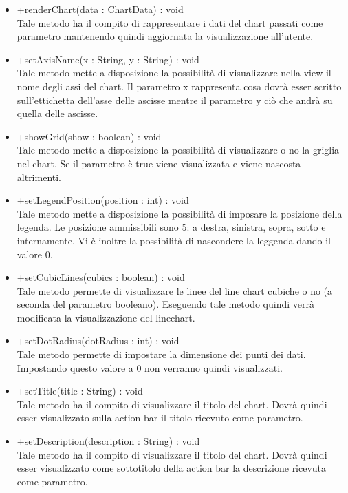 \begin{itemize}
\begin{itemize}
					\item[\ding{111}] {{+renderChart(data : ChartData) : void}} \\ [1mm] Tale metodo ha il compito di rappresentare i dati del chart passati come parametro mantenendo quindi aggiornata la visualizzazione all'utente.
					\item[\ding{111}] {{+setAxisName(x : String, y : String) : void}} \\ [1mm] Tale metodo mette a disposizione la possibilità di visualizzare nella view il nome degli assi del chart. Il parametro x rappresenta cosa dovrà esser scritto sull'ettichetta dell'asse delle ascisse mentre il parametro y ciò che andrà su quella delle ascisse.
					\item[\ding{111}] {{+showGrid(show : boolean) : void}} \\ [1mm] Tale metodo mette a disposizione la possibilità di visualizzare o no la griglia nel chart. Se il parametro è true viene visualizzata e viene nascosta altrimenti.
					\item[\ding{111}] {{+setLegendPosition(position : int) : void}} \\ [1mm] Tale metodo mette a disposizione la possibilità di imposare la posizione della legenda. Le posizione ammissibili sono 5: a destra, sinistra, sopra, sotto e internamente. Vi è inoltre la possibilità di nascondere la leggenda dando il valore 0.
					\item[\ding{111}] {{+setCubicLines(cubics : boolean) : void}} \\ [1mm] Tale metodo permette di visualizzare le linee del line chart cubiche o no (a seconda del parametro booleano). Eseguendo tale metodo quindi verrà modificata la visualizzazione del linechart.
					\item[\ding{111}] {{+setDotRadius(dotRadius : int) : void}} \\ [1mm] Tale metodo permette di impostare la dimensione dei punti dei dati. Impostando questo valore a 0 non verranno quindi visualizzati.
					\item[\ding{111}] {{+setTitle(title : String) : void}} \\ [1mm] Tale metodo ha il compito di visualizzare il titolo del chart. Dovrà quindi esser visualizzato sulla action bar il titolo ricevuto come parametro.
					\item[\ding{111}] {{+setDescription(description : String) : void}} \\ [1mm] Tale metodo ha il compito di visualizzare il titolo del chart. Dovrà quindi esser visualizzato come sottotitolo della action bar la descrizione ricevuta come parametro.
				\end{itemize}
		
			\end{itemize}

